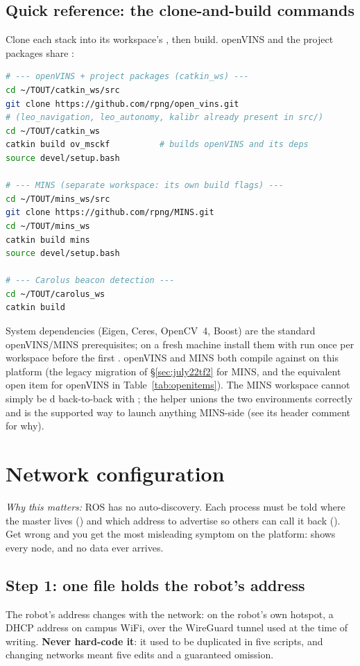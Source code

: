 \subsection{Quick reference: the clone-and-build commands}
\label{ap:repro-build-ref}
Clone each stack into its workspace's , then build. openVINS and
the project packages share :

\begin{lstlisting}[language=bash]
# --- openVINS + project packages (catkin_ws) ---
cd ~/TOUT/catkin_ws/src
git clone https://github.com/rpng/open_vins.git
# (leo_navigation, leo_autonomy, kalibr already present in src/)
cd ~/TOUT/catkin_ws
catkin build ov_msckf          # builds openVINS and its deps
source devel/setup.bash

# --- MINS (separate workspace: its own build flags) ---
cd ~/TOUT/mins_ws/src
git clone https://github.com/rpng/MINS.git
cd ~/TOUT/mins_ws
catkin build mins
source devel/setup.bash

# --- Carolus beacon detection ---
cd ~/TOUT/carolus_ws
catkin build
\end{lstlisting}

\noindent System dependencies (Eigen, Ceres, OpenCV~4, Boost) are the
standard openVINS/MINS prerequisites; on a fresh machine install them with
 run once per
workspace before the first . openVINS and MINS both
compile against  on this platform (the legacy 
migration of \S\ref{sec:july22tf2} for MINS, and the equivalent open item
for openVINS in Table~\ref{tab:openitems}). The MINS workspace cannot simply
be d back-to-back with ; the
 helper unions the two environments correctly and
is the supported way to launch anything MINS-side (see its header comment for
why).

\section{Network configuration}
\label{ap:repro-net}
\emph{Why this matters:} ROS has no auto-discovery. Each process must be told
where the master lives () and which address to advertise
so others can call it back (). Get  wrong and you
get the most misleading symptom on the platform:  shows
every node, and no data ever arrives.

\subsection{Step 1: one file holds the robot's address}
The robot's address changes with the network:  on the robot's own
hotspot, a DHCP address on campus WiFi,  over the WireGuard
tunnel used at the time of writing. \textbf{Never hard-code it}: it used to
be duplicated in five scripts, and changing networks meant five edits and a
guaranteed omission.

